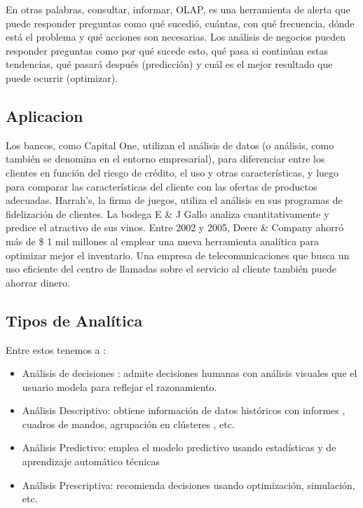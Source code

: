 \documentclass[preprint,12pt]{elsarticle}
\begin{document}
	En otras palabras, consultar, informar, OLAP, es una herramienta de alerta que puede responder preguntas como qué sucedió, cuántas, con qué frecuencia, dónde está el problema y qué acciones son necesarias. Los análisis de negocios pueden responder preguntas como por qué sucede esto, qué pasa si continúan estas tendencias, qué pasará después (predicción) y cuál es el mejor resultado que puede ocurrir (optimizar).
		
	\subsection{Aplicacion}
	
	Los bancos, como Capital One, utilizan el análisis de datos (o análisis, como también se denomina en el entorno empresarial), para diferenciar entre los clientes en función del riesgo de crédito, el uso y otras características, y luego para comparar las características del cliente con las ofertas de productos adecuadas. Harrah's, la firma de juegos, utiliza el análisis en sus programas de fidelización de clientes. La bodega E \& J Gallo analiza cuantitativamente y predice el atractivo de sus vinos. Entre 2002 y 2005, Deere \& Company ahorró más de \$ 1 mil millones al emplear una nueva herramienta analítica para optimizar mejor el inventario. Una empresa de telecomunicaciones que busca un uso eficiente del centro de llamadas sobre el servicio al cliente también puede ahorrar dinero.
		
	\subsection{Tipos de Analítica}
	
	Entre estos tenemos a :
	\begin{itemize}
		\item Análisis de decisiones : admite decisiones humanas con análisis visuales que el usuario modela para reflejar el razonamiento.
		\item Análisis Descriptivo: obtiene información de datos históricos con informes , cuadros de mandos, agrupación en clústeres , etc.
		\item Análisis Predictivo: emplea el modelo predictivo usando estadísticas y de aprendizaje automático técnicas
		\item Análisis Prescriptiva: recomienda decisiones usando optimización, simulación, etc.
	\end{itemize}
\end{document}
